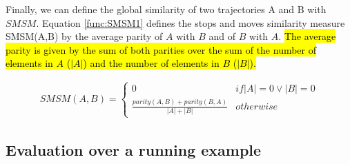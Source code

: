 \documentclass[12pt]{article}
\begin{document}
Finally, we can define the global similarity of two trajectories A and B with $SMSM$. Equation \ref{func:SMSM1} defines the stops and moves similarity measure SMSM(A,B) by the average parity of $A$ with $B$ and of $B$ with $A$. \hl{The average parity is given by the sum of both parities over the sum of the number of elements in $A$ ($|A|$) and the number of elements in $B$ ($|B|$).}

\begin{equation}
\label{func:SMSM1}
\begin{split}
  SMSM(A, B) = 
  \begin{cases} 
      0 & if  |A| = 0 \vee |B| = 0 \\
      \frac{parity(A, B) + parity(B, A)}{|A| + |B|} & otherwise
  \end{cases}
\end{split}
\end{equation}



\subsection{Evaluation over a running example}
\end{document}
